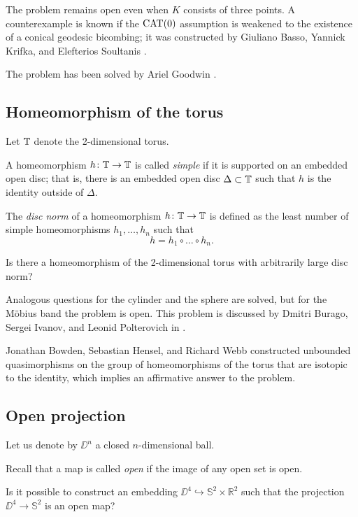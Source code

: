 The problem remains open even when $K$ consists of three points.
A counterexample is known if the $\mathop{\rm CAT}(0)$ assumption is weakened to the existence of a conical geodesic bicombing; it was constructed by Giuliano Basso, Yannick Krifka, and Elefterios Soultanis \cite{BKS}.

The problem has been solved by Ariel Goodwin \cite{goodwin2026, lytchak2026}.
 
\subsection{Homeomorphism of the torus}

Let $\mathbb{T}$ denote the 2-dimensional torus.

A homeomorphism $h\colon\mathbb{T}\to \mathbb{T}$ is called \emph{simple} if it is supported on an embedded open disc;
that is, there is an embedded open disc $\Delta\subset \mathbb{T}$ such that $h$ is the identity outside of $\Delta$.

The \emph{disc norm} of a homeomorphism $h\colon\mathbb{T}\to \mathbb{T}$ is defined as the least number of simple homeomorphisms $h_1,\dots,h_n$ such that
\[h=h_1\circ\dots\circ h_n.\]

\begin{pr}
Is there a homeomorphism of the 2-dimensional torus with arbitrarily large disc norm?
\end{pr}

Analogous questions for the cylinder and the sphere are solved, but for the Möbius band the problem is open.
This problem is discussed by Dmitri Burago, Sergei Ivanov, and Leonid Polterovich in \cite{BIP}.

Jonathan Bowden, Sebastian Hensel, and Richard Webb \cite{bowden-hensel-webb} constructed unbounded quasimorphisms on the group of homeomorphisms of the torus that are isotopic to the identity, which implies an affirmative answer to the problem.

\subsection{Open projection}

Let us denote by $\DD^n$ a closed $n$-dimensional ball.

Recall that a map is called \emph{open} if the image of any open set is open.

\begin{pr}
Is it possible to construct an embedding $\DD^4\hookrightarrow \mathbb{S}^2\times
\mathbb R^2$
such that the projection  $\DD^4\to \mathbb{S}^2$ is an open map?
\end{pr}

